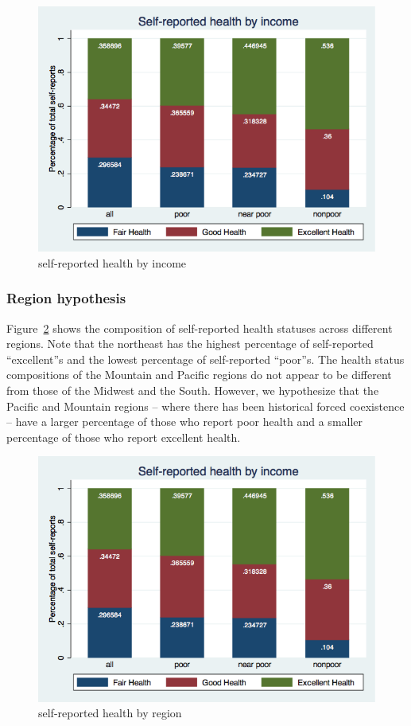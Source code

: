 \documentclass[12pt]{article}
\begin{document}
\begin{figure}[ht!]
\centering
\includegraphics[scale=0.3]{health_status_by_income.png}
\caption{self-reported health by income}
\label{fig:health_status_by_income}
\end{figure}

\subsubsection{Region hypothesis}
Figure~\ref{fig:health_status_by_region} shows the composition of self-reported health statuses across different regions. 
Note that the northeast has the highest percentage of self-reported ``excellent''s and the lowest percentage of self-reported ``poor''s. 
The health status compositions of the Mountain and Pacific regions do not appear to be different from those of the Midwest and the South. 
However, we hypothesize that the Pacific and Mountain regions -- where there has been historical forced coexistence -- have a larger percentage of those who report poor health and a smaller percentage of those who report excellent health.

\begin{figure}[ht!]
\centering
\includegraphics[scale=0.3]{health_status_by_income.png}
\caption{self-reported health by region}
\label{fig:health_status_by_region}
\end{figure}
\end{document}
